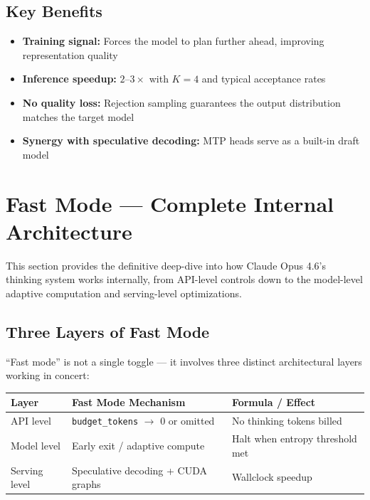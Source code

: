\documentclass[11pt,a4paper]{article}
\begin{document}
\subsection{Key Benefits}

\begin{itemize}[itemsep=1pt]
  \item \textbf{Training signal:} Forces the model to plan further ahead, improving representation quality
  \item \textbf{Inference speedup:} $2\text{--}3\times$ with $K = 4$ and typical acceptance rates
  \item \textbf{No quality loss:} Rejection sampling guarantees the output distribution matches the target model
  \item \textbf{Synergy with speculative decoding:} MTP heads serve as a built-in draft model
\end{itemize}

\section{Fast Mode --- Complete Internal Architecture}

This section provides the definitive deep-dive into how Claude Opus 4.6's thinking system works internally, from API-level controls down to the model-level adaptive computation and serving-level optimizations.

\subsection{Three Layers of Fast Mode}

``Fast mode'' is not a single toggle --- it involves three distinct architectural layers working in concert:

\begin{center}
\begin{tabular}{lL{4cm}L{5cm}}
\toprule
\textbf{Layer} & \textbf{Fast Mode Mechanism} & \textbf{Formula / Effect} \\
\midrule
API level & \texttt{budget\_tokens} $\to$ 0 or omitted & No thinking tokens billed \\
Model level & Early exit / adaptive compute & Halt when entropy threshold met \\
Serving level & Speculative decoding + CUDA graphs & Wallclock speedup \\
\bottomrule
\end{tabular}
\end{center}
\end{document}
